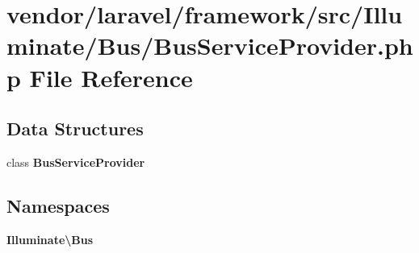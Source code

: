 \section{vendor/laravel/framework/src/\+Illuminate/\+Bus/\+Bus\+Service\+Provider.php File Reference}
\label{vendor_2laravel_2framework_2src_2_illuminate_2_bus_2_bus_service_provider_8php}
\subsection*{Data Structures}
\begin{DoxyCompactItemize}
\item 
class {\bf Bus\+Service\+Provider}
\end{DoxyCompactItemize}
\subsection*{Namespaces}
\begin{DoxyCompactItemize}
\item 
 {\bf Illuminate\textbackslash{}\+Bus}
\end{DoxyCompactItemize}
